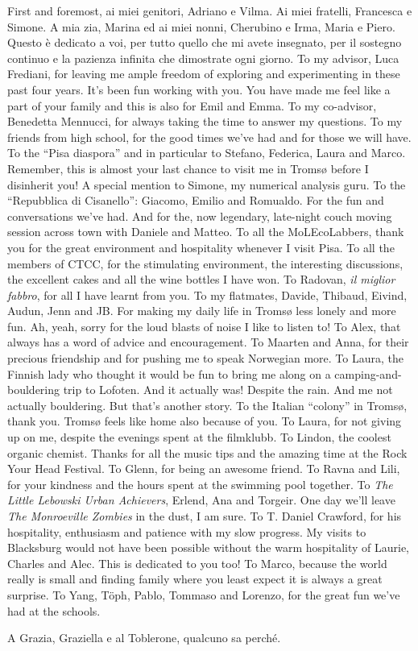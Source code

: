 First and foremost, \textitalian{ai miei genitori,
Adriano e Vilma. Ai miei fratelli, Francesca e Simone. A mia zia, Marina
ed ai miei nonni, Cherubino e Irma, Maria e Piero. Questo è dedicato a
voi, per tutto quello che mi avete insegnato, per il sostegno continuo e
la pazienza infinita che dimostrate ogni giorno.}
To my advisor, Luca Frediani, for leaving me ample freedom of exploring
and experimenting in these past four years.
It's been fun working with you. You have made me feel like a part of
your family and this is also for Emil and Emma.
To my co-advisor, Benedetta Mennucci, for always taking the time to
answer my questions.
To my friends from high school, for the good times we've had and for
those we will have.
To the \enquote{Pisa diaspora} and in particular to Stefano, Federica,
Laura and Marco. Remember, this is almost your last chance to visit me in Tromsø
before I disinherit you!
A special mention to Simone, my numerical analysis guru.
To the \enquote{Repubblica di Cisanello}: Giacomo, Emilio and Romualdo.
For the fun and conversations we've had. And for the, now legendary,
late-night couch moving session across town with Daniele and Matteo.
To all the MoLEcoLabbers, thank you for the great environment and
hospitality whenever I visit Pisa.
To all the members of CTCC, for the stimulating environment, the
interesting discussions, the excellent cakes and all the wine bottles I
have won.
To Radovan, \emph{il miglior fabbro}, for all I have learnt
from you.
To my flatmates, Davide, Thibaud, Eivind, Audun, Jenn and JB. For making
my daily life in Tromsø less lonely and more fun.
Ah, yeah, sorry for the loud blasts of noise I like to listen to!
To Alex, that always has a word of advice and encouragement.
To Maarten and Anna, for their precious friendship and for pushing me to
speak Norwegian more.
To Laura, the Finnish lady who thought it would be fun to bring me along
on a camping-and-bouldering trip to Lofoten. And it actually was!
Despite the rain. And me not actually bouldering. But that's another
story.
To the Italian \enquote{colony} in Tromsø, thank you. Tromsø feels like
home also because of you.
To Laura, for not giving up on me, despite the evenings spent at the
filmklubb.
To Lindon, the coolest organic chemist. Thanks for all the music tips
and the amazing time at the Rock Your Head Festival.
To Glenn, for being an awesome friend.
To Ravna and Lili, for your kindness and the hours spent at the swimming
pool together.
To \emph{The Little Lebowski Urban Achievers}, Erlend, Ana and Torgeir.
One day we'll leave \emph{The Monroeville Zombies} in the dust, I am
sure.
To T. Daniel Crawford, for his hospitality, enthusiasm and patience with
my slow progress.
My visits to Blacksburg would not have been possible without the warm
hospitality of Laurie, Charles and Alec. This is dedicated to you too!
To Marco, because the world really is small and finding family where you
least expect it is always a great surprise.
To Yang, Töph, Pablo, Tommaso and Lorenzo, for the great fun we've had at the
schools.

\textitalian{A Grazia, Graziella e al Toblerone, qualcuno sa perché.}
